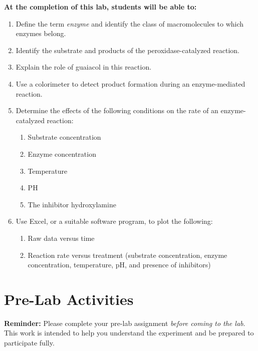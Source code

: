 \documentclass[
  letterpaper,
  DIV=11,
  numbers=noendperiod]{scrreprt}
\providecommand{\tightlist}{%
  \setlength{\itemsep}{0pt}\setlength{\parskip}{0pt}}
\begin{document}
\textbf{At the completion of this lab, students will be able to:}

\begin{enumerate}
\def\labelenumi{\arabic{enumi})}
\item
  Define the term \emph{enzyme} and identify the class of macromolecules
  to which enzymes belong.
\item
  Identify the substrate and products of the peroxidase-catalyzed
  reaction.
\item
  Explain the role of guaiacol in this reaction.
\item
  Use a colorimeter to detect product formation during an
  enzyme-mediated reaction.
\item
  Determine the effects of the following conditions on the rate of an
  enzyme-catalyzed reaction:

  \begin{enumerate}
  \def\labelenumii{\alph{enumii})}
  \item
    Substrate concentration
  \item
    Enzyme concentration
  \item
    Temperature
  \item
    PH
  \item
    The inhibitor hydroxylamine
  \end{enumerate}
\item
  Use Excel, or a suitable software program, to plot the following:\\

  \begin{enumerate}
  \def\labelenumii{\alph{enumii}.}
  \tightlist
  \item
    Raw data versus time\\
  \item
    Reaction rate versus treatment (substrate concentration, enzyme
    concentration, temperature, pH, and presence of inhibitors)
  \end{enumerate}
\end{enumerate}

\section{\texorpdfstring{\textbf{Pre-Lab
Activities}}{Pre-Lab Activities}}\label{pre-lab-activities}

\textbf{Reminder:} Please complete your pre-lab assignment \emph{before
coming to the lab}. This work is intended to help you understand the
experiment and be prepared to participate fully.
\end{document}
